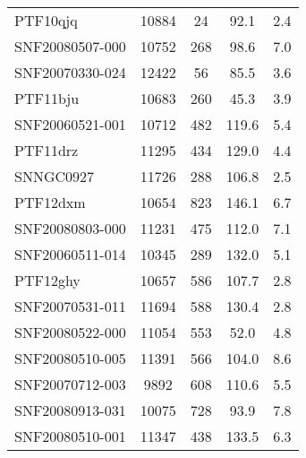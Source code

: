 \begin{longtable}{lcccc}
PTF10qjq & 10884 & 24 & 92.1 & 2.4 \\
SNF20080507-000 & 10752 & 268 & 98.6 & 7.0 \\
SNF20070330-024 & 12422 & 56 & 85.5 & 3.6 \\
PTF11bju & 10683 & 260 & 45.3 & 3.9 \\
SNF20060521-001 & 10712 & 482 & 119.6 & 5.4 \\
PTF11drz & 11295 & 434 & 129.0 & 4.4 \\
SNNGC0927 & 11726 & 288 & 106.8 & 2.5 \\
PTF12dxm & 10654 & 823 & 146.1 & 6.7 \\
SNF20080803-000 & 11231 & 475 & 112.0 & 7.1 \\
SNF20060511-014 & 10345 & 289 & 132.0 & 5.1 \\
PTF12ghy & 10657 & 586 & 107.7 & 2.8 \\
SNF20070531-011 & 11694 & 588 & 130.4 & 2.8 \\
SNF20080522-000 & 11054 & 553 & 52.0 & 4.8 \\
SNF20080510-005 & 11391 & 566 & 104.0 & 8.6 \\
SNF20070712-003 & 9892 & 608 & 110.6 & 5.5 \\
SNF20080913-031 & 10075 & 728 & 93.9 & 7.8 \\
SNF20080510-001 & 11347 & 438 & 133.5 & 6.3 \\
\end{longtable}
